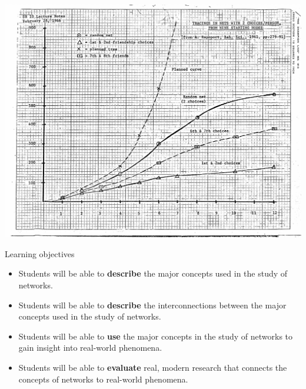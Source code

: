 \documentclass[aspectratio=169]{beamer}
\begin{document}
\begin{frame}

\begin{center}
\includegraphics[height=0.9\textheight]{figures/white_classnotes_swt}
\end{center}


\end{frame}
\begin{frame}

\begin{center}
\Large{Learning objectives}
\end{center}

\end{frame}
\begin{frame}

\begin{itemize}
\item Students will be able to \textbf{describe} the major concepts used in the study of networks.
\pause
\item Students will be able to \textbf{describe} the interconnections between the major concepts used in the study of networks.
\pause
\item Students will be able to \textbf{use} the major concepts in the study of networks to gain insight into real-world phenomena.
\pause
\item Students will be able to \textbf{evaluate} real, modern research that connects the concepts of networks to real-world phenomena.
\end{itemize}

\end{frame}
\end{document}
